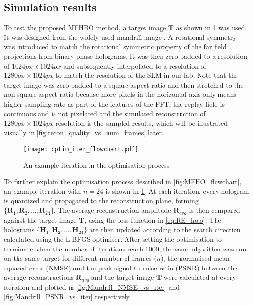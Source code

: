 \subsection{Simulation results}
	To test the proposed MFHBO method, a target image $\textbf{T}$ as shown in \cref{fig:optim_iter_flowchart} was used. It was designed from the widely used mandrill image \cite{MANDRILL_REF}. A rotational symmetry was introduced to match the rotational symmetric property of the far field projections from binary phase holograms. It was then zero padded to a resolution of $1024px\times 1024px$ and subsequently interpolated to a resolution of $1280px\times 1024px$ to match the resolution of the SLM in our lab. Note that the target image was zero padded to a square aspect ratio and then stretched to the non-square aspect ratio because more pixels in the horizontal axis only means higher sampling rate as part of the features of the FFT, the replay field is continuous and is not pixelated and the simulated reconstruction of $1280px\times 1024px$ resolution is the sampled results, which will be illustrated visually in \cref{fig:recon_quality_vs_num_frames} later.

	\begin{figure}[h!t]
		\centering
		\texttt{[image: optim\_iter\_flowchart.pdf]}
		\caption{An example iteration in the optimisation process}
		\label{fig:optim_iter_flowchart}
	\end{figure}

	To further explain the optimisation process described in \cref{fig:MFHO_flowchart}, an example iteration with $n=24$ is shown in \cref{fig:optim_iter_flowchart}. At each iteration, every hologram is quantized and propagated to the reconstruction plane, forming $\{\textbf{R}_1, \textbf{R}_2, ..., \textbf{R}_{24}\}$. The average reconstruction amplitude $\textbf{R}_{avg}$ is then compared against the target image $\textbf{T}$, using the loss function in \cref{eq:RE_holo}. The holograms $\{\textbf{H}_1, \textbf{H}_2, ..., \textbf{H}_{24}\}$ are then updated according to the search direction calculated using the L-BFGS optimiser. After setting the optimisation to terminate when the number of iterations reach $1000$, the same algorithm was run on the same target for different number of frames ($n$), the normalised mean squared error (NMSE) and the peak signal-to-noise ratio (PSNR) between the average reconstructions $\textbf{R}_{avg}$ and the target image $\textbf{T}$ were calculated at every iteration and plotted in \cref{fig:Mandrill_NMSE_vs_iter} and \cref{fig:Mandrill_PSNR_vs_iter} respectively.


